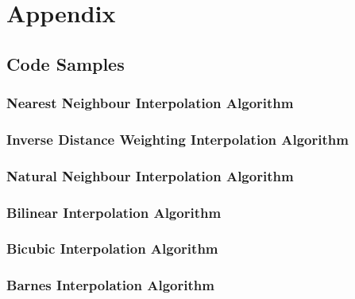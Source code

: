 \chapter{Appendix}\label{Appendix}

    \section{Code Samples}
        
        \subsection{Nearest Neighbour Interpolation Algorithm}


        \subsection{Inverse Distance Weighting Interpolation Algorithm}


        \subsection{Natural Neighbour Interpolation Algorithm}


        \subsection{Bilinear Interpolation Algorithm}


        \subsection{Bicubic Interpolation Algorithm}


        \subsection{Barnes Interpolation Algorithm}



